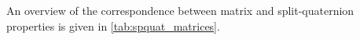 An overview of the correspondence between matrix and split-quaternion properties is given in \cref{tab:spquat_matrices}.


    
